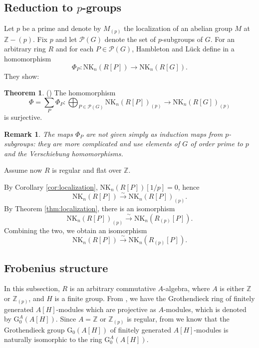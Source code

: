\documentclass[reqno,11pt,letterpaper]{amsart}
\theoremstyle{plain}
\numberwithin{equation}{subsection}
\newtheorem{theorem}[equation]{Theorem}
\newtheorem{Remark}[equation]{Remark}
\theoremstyle{remark}
\theoremstyle{plain}
\theoremstyle{definition}\newtheorem*{notation}{Notation}
\newtheorem{theorem}{Theorem}
\newcommand{\RG}{\mathrm{G}}
\newcommand{\RNK}{\mathrm{NK}}
\newcommand{\BZ}{\mathbb{Z}}
\begin{document}
\subsection{Reduction to $p$-groups}

Let $p$ be a prime and denote by $M_{(p)}$ the localization of an abelian group $M$ at $\mathbb{Z} - (p)$. Fix  $p$ and 
let $\mathcal{P}( G) $ denote the set of $p$-subgroups of $G$.
For an arbitrary ring $R $ and for each $P\in \mathcal{P}( G) $, Hambleton and L\"uck define in \cite{HLuck} a homomorphism
\begin{equation*}
\Phi _{P}:\RNK_{n}( R[ P] ) \rightarrow \RNK_{n}( R%
[ G] ). 
\end{equation*}
They show:

\begin{theorem}\label{HambletonL}  (\cite[Theorem A]{HLuck})
 The homomorphism
\begin{equation*}
\Phi =\sum_P \Phi _{P}:\bigoplus _{P\in \mathcal{P}( G)
}\RNK_{n}( R[ P] ) _{( p) }\rightarrow
\RNK_{n}( R[ G] ) _{( p) }
\end{equation*}
is surjective.
\end{theorem}

\begin{Remark}
{\rm The maps $\Phi _{P}$ are not given simply as induction maps from $p$-subgroups: they are more complicated and use elements of $G$ of order prime to 
$p$ and the Verschiebung homomorphisms. }
\end{Remark}

Assume now $R$ is regular and flat over $\BZ$.  

By Corollary \ref{cor:localization},   $\RNK_n(R[P])[1/p]=0$, hence
\[
\RNK_{n}( R[ P] )\xrightarrow{\sim}  \RNK_{n}( R [ P] )_{(p)}.
\]
By Theorem  \ref{thm:localization}, there is an isomorphism
\[
\RNK_{n}( R[ P] )_{(p)}\xrightarrow{\sim}   \RNK_{n}( R_{(p)}[ P] ).
\] 
Combining the two, we obtain an isomorphism
\begin{equation}\label{localizationiso}
\RNK_{n}( R[P] ) \xrightarrow{\sim}  \RNK_{n}( R_{(p)}[ P] ).
\end{equation}
 
 \subsection{Frobenius structure}
 In this subsection, $R$ is an arbitrary commutative $A$-algebra, where $A$ is either $\BZ$ or $\BZ_{(p)}$, and $H$ is a finite group. From \cite{CR94}, we have the Grothendieck ring of finitely generated $A[H]$-modules which are projective as $A$-modules, which is denoted by $\RG^{A}_{0}( A[ H])$. 
Since $A=\mathbb{Z}$ or $\BZ_{(p)}$ is regular, from \cite[p. 22]{CR94} we know that the Grothendieck group  $\RG_{0}(A[H] )$ of finitely generated $A[H]$-modules is naturally isomorphic to the ring  $\RG_{0}^{A}(A[ H] )$. 
\end{document}
